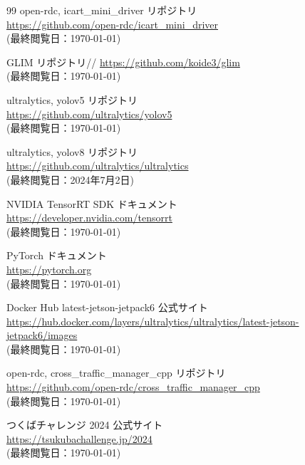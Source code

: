 \documentclass[twocolumn, 9pt]{jsproceedings}
\begin{document}
\begin{thebibliography}{99}
open-rdc, icart\_mini\_driver リポジトリ\\
\url{https://github.com/open-rdc/icart_mini_driver}\\
(最終閲覧日：\today)

GLIM リポジトリ//
\url{https://github.com/koide3/glim}\\
(最終閲覧日：\today)

ultralytics, yolov5 リポジトリ\\
\url{https://github.com/ultralytics/yolov5}\\
(最終閲覧日：\today)

ultralytics, yolov8 リポジトリ\\
\url{https://github.com/ultralytics/ultralytics}\\
(最終閲覧日：2024年7月2日)

NVIDIA TensorRT SDK ドキュメント\\
\url{https://developer.nvidia.com/tensorrt}\\
(最終閲覧日：\today)

PyTorch ドキュメント\\
\url{https://pytorch.org}\\
(最終閲覧日：\today)

Docker Hub latest-jetson-jetpack6 公式サイト\\
\url{https://hub.docker.com/layers/ultralytics/ultralytics/latest-jetson-jetpack6/images}\\
(最終閲覧日：\today)

open-rdc, cross\_traffic\_manager\_cpp リポジトリ\\
\url{https://github.com/open-rdc/cross_traffic_manager_cpp}\\
(最終閲覧日：\today)

つくばチャレンジ 2024 公式サイト\\
\url{https://tsukubachallenge.jp/2024}\\
(最終閲覧日：\today)









\end{thebibliography}
\normalsize
\end{document}
